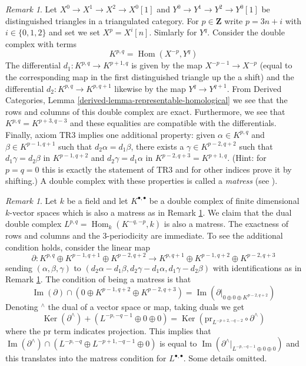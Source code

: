 \documentclass{stacks-project}
\theoremstyle{plain}
\theoremstyle{definition}
\theoremstyle{remark}
\newtheorem{remark}[subsection]{Remark}
\numberwithin{equation}{subsection}
\def\Hom{\mathop{\mathrm{Hom}}\nolimits}
\def\Ker{\mathop{\mathrm{Ker}}}
\def\Im{\mathop{\mathrm{Im}}}
\begin{document}
\begin{remark}
\label{remark-matress}
Let $X^0 \to X^1 \to X^2 \to X^0[1]$ and $Y^0 \to Y^1 \to Y^2 \to Y^0[1]$
be distinguished triangles in a triangulated category. For
$p \in \mathbf{Z}$ write $p = 3n + i$ with $i \in \{0, 1, 2\}$ and set
we set $X^p = X^i[n]$. Simlarly for $Y^q$. Consider the double complex
with terms
$$
K^{p, q} = \Hom(X^{-p}, Y^q)
$$
The differential $d_1 : K^{p, q} \to K^{p + 1, q}$ is given by the map
$X^{-p - 1} \to X^{-p}$ (equal to the corresponding map
in the first distinguished triangle up the a shift)
and the differential $d_2 : K^{p, q} \to K^{p, q + 1}$ likewise
by the map $Y^q \to Y^{q + 1}$. From
Derived Categories, Lemma \ref{derived-lemma-representable-homological}
we see that the rows and columns of this double complex are exact.
Furthermore, we see that $K^{p, q} = K^{p + 3, q - 3}$ and these
equalities are compatible with the differentials. Finally, axiom TR3
implies one additional property: given
$\alpha \in K^{p, q}$ and $\beta \in K^{p - 1, q + 1}$ such
that $d_2 \alpha = d_1 \beta$, there exists a $\gamma \in K^{p - 2, q + 2}$
such that
$d_1 \gamma = d_2 \beta $ in $K^{p - 1, q + 2}$ and 
$d_2 \gamma = d_1 \alpha $ in $K^{p - 2, q + 3} = K^{p + 1, q}$.
(Hint: for $p = q = 0$ this is exactly the statement of TR3
and for other indices prove it by shifting.)
A double complex with these properties is called a {\it matress}
(see \cite{Bondal-Kapranov}).
\end{remark}

\begin{remark}
\label{remark-dual-matress}
Let $k$ be a field and let $K^{\bullet, \bullet}$ be a double complex
of finite dimensional $k$-vector spaces which is also a matress as in
Remark \ref{remark-matress}. We claim that the dual double complex
$L^{p, q} = \Hom_k(K^{-q, -p}, k)$ is also a matress. The exactness of
rows and columns and the 3-periodicity are immediate. To see the
additional condition holds, consider the linear map
$$
\partial :
K^{p, q} \oplus K^{p - 1, q + 1} \oplus K^{p - 2, q + 2}
\longrightarrow
K^{p, q + 1} \oplus K^{p - 1, q + 2} \oplus K^{p - 2, q + 3}
$$
sending $(\alpha, \beta, \gamma)$ to
$(d_2 \alpha - d_1 \beta, d_2 \gamma - d_1 \alpha, d_1 \gamma - d_2 \beta)$
with identifications as in Remark \ref{remark-matress}.
The condition of being a matress is that
$$
\Im(\partial) \cap
\left( 0 \oplus K^{p - 1, q + 2} \oplus K^{p - 2, q + 3} \right)
=
\Im(\partial|_{0 \oplus 0 \oplus K^{p - 2, q + 2}})
$$
Denoting ${}^\wedge$ the dual of a vector space or map, taking duals
we get
$$
\Ker(\partial^\wedge) +
\left(L^{-p, -q - 1} \oplus 0 \oplus 0 \right)
=
\Ker(\text{pr}_{L^{-p + 2, -q - 2}} \circ \partial^\wedge)
$$
where the $\text{pr}$ term indicates projection. This implies
that
$\Im(\partial^\wedge) \cap (L^{-p, -q} \oplus L^{-p + 1, -q - 1} \oplus 0)$
is equal to
$\Im(\partial^\wedge|_{L^{-p, -q - 1} \oplus 0 \oplus 0})$ and this
translates into the matress condition for $L^{\bullet, \bullet}$.
Some details omitted.
\end{remark}
\end{document}
